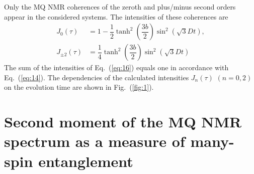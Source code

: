 Only the MQ NMR coherences of the zeroth and plus/minus second orders appear in the considered systems.
The intensities of these coherences are
%
\begin{equation}
    \begin{split}
        \label{eq:16}
        J_0(\tau) & = 1
        - \dfrac 1 2 \tanh^2\left( \dfrac{3b}{2} \right)
            \sin^2 \left( \sqrt{3} Dt \right),
        \\
        J_{\pm2}(\tau) & = \dfrac{1}{4}
            \tanh^2 \left( \dfrac{3b}{2} \right)
            \sin^2 \left( \sqrt{3} Dt \right)
    \end{split}
\end{equation}
%
The sum of the intensities of Eq.~(\ref{eq:16}) equals one in accordance with Eq.~(\ref{eq:14}).
The dependencies of the calculated intensities $J_{n}(\tau)$ $(n=0,2)$ on the evolution time are shown in Fig.~(\ref{fig:1}).



\section{Second moment of the MQ NMR spectrum as a measure of many-spin entanglement}
\label{sec:4}

